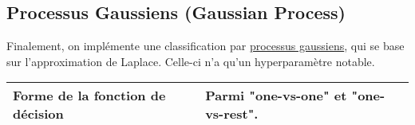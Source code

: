 \subsection{Processus Gaussiens (Gaussian Process)}

Finalement, on implémente une classification par \href{https://scikit-learn.org/stable/modules/generated/sklearn.gaussian_process.GaussianProcessClassifier.html}{processus gaussiens}, qui se base sur l'approximation de Laplace. Celle-ci n'a qu'un hyperparamètre notable.\\

\noindent
\begin{tabularx}{\textwidth}{|X|X|}
    \hline
     Forme de la fonction de décision  & Parmi "one-vs-one" et "one-vs-rest".\\\hline
\end{tabularx}